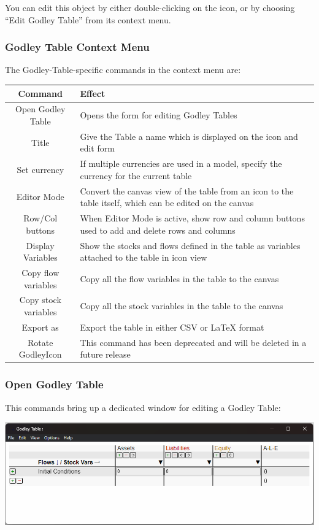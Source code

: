 You can edit this object by either double-clicking on the icon, or
by choosing ``Edit Godley Table'' from its context menu.

\subsubsection{Godley Table Context Menu}

The Godley-Table-specific commands in the context menu are:

\begin{tabular}{|c|p{}|}
\hline 
Command & Effect\tabularnewline
\hline 
\hline 
Open Godley Table & Opens the form for editing Godley Tables\tabularnewline
\hline 
Title & Give the Table a name which is displayed on the icon and edit form\tabularnewline
\hline 
Set currency & If multiple currencies are used in a model, specify the currency for
the current table\tabularnewline
\hline 
Editor Mode & Convert the canvas view of the table from an icon to the table itself,
which can be edited on the canvas\tabularnewline
\hline 
Row/Col buttons & When Editor Mode is active, show row and column buttons used to add
and delete rows and columns\tabularnewline
\hline 
Display Variables & Show the stocks and flows defined in the table as variables attached
to the table in icon view\tabularnewline
\hline 
Copy flow variables & Copy all the flow variables in the table to the canvas\tabularnewline
\hline 
Copy stock variables & Copy all the stock variables in the table to the canvas\tabularnewline
\hline 
Export as & Export the table in either CSV or LaTeX format\tabularnewline
\hline 
Rotate GodleyIcon & This command has been deprecated and will be deleted in a future release\tabularnewline
\hline 
\end{tabular}

\subsubsection{Open Godley Table}

This commands bring up a dedicated window for editing a Godley Table:

\noindent\includegraphics[width=\textwidth]{images/GodleyTableEditWindow}


